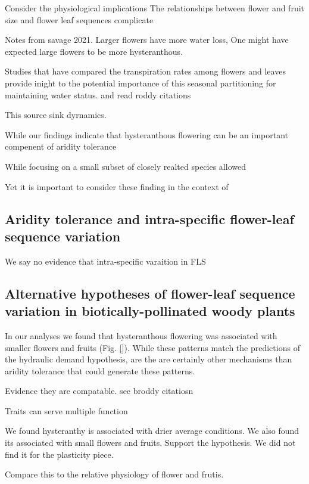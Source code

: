 \documentclass{article}\usepackage[]{graphicx}\usepackage[]{color}
\begin{document}
Consider the physiological implications
The relationships between flower and fruit size and flower leaf sequences complicate

Notes from savage 2021. Larger flowers have more water loss, One might have expected large flowers to be more hysteranthous.

Studies that have compared the transpiration rates among flowers and leaves provide inight to the potential importance of this seasonal partitioning for maintaining water status. \citep{Liu:2017wg,Whiley:1988uf,Galen:1999vr,Lambrecht:2007ur,Roddy:2019wb} and read roddy citations

This source sink dyrnamics.



While our findings indicate that hysteranthous flowering can be an important compenent of aridity tolerance

While focusing on a small subset of closely realted species allowed


Yet it is important to consider these finding in the context of




\subsection*{Aridity tolerance and intra-specific flower-leaf sequence variation}
We say no evidence that intra-specific varaition in FLS

\subsection*{Alternative hypotheses of flower-leaf sequence variation in biotically-pollinated woody plants}

In our analyses we found that hysteranthous flowering was associated with smaller flowers and fruits (Fig. \ref{}). While these patterns match the predictions of the hydraulic demand hypothesis, are the are certainly other mechanisms than aridity tolerance that could generate these patterns. 

Evidence they are compatable. see broddy citatiosn

Traits can serve multiple function


We found hysteranthy is associated with drier average conditions. We also found its associated with small flowers and fruits. Support the hypothesis.
We did not find it for the plasticity piece.

Compare this to the relative physiology of flower and frutis.
\end{document}
